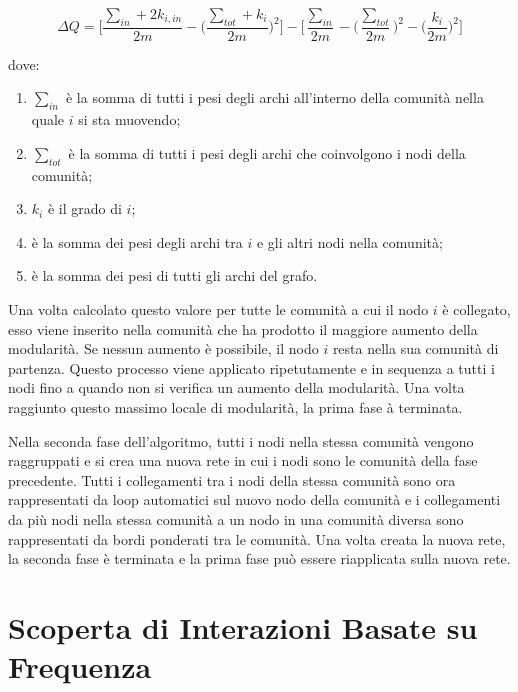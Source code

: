\begin{equation}
\Delta Q = \Biggl[ \frac{\sum_{in} + 2k_{i,in}}{2m} - \Biggl(\frac{\sum_{tot} + k_i}{2m} \Biggr)^2 \Biggr] - \Biggl[ \frac{\sum_{in}}{2m} - \Biggl(\frac{\sum_{tot}}{2m} \Biggr)^2 - \Biggl(\frac{k_i}{2m} \Biggr)^2 \Biggr]
\end{equation}

dove:

\begin{enumerate}[label=(\roman*)]
  
\item \( \sum_{in} \) {\`e} la somma di tutti i pesi degli archi all'interno della comunità nella quale \( i \) si sta muovendo;
\item \( \sum_{tot} \) {\`e}  la somma di tutti i pesi degli archi che coinvolgono i nodi della comunit{\`a};
\item \( k_i \) {\`e} il grado di \( i \);
\item {\`e} la somma dei pesi degli archi tra \( i \) e gli altri nodi nella comunit{\`a};
\item {\`e} la somma dei pesi di tutti gli archi del grafo.

\end{enumerate}

Una volta calcolato questo valore per tutte le comunit{\`a} a cui il nodo \( i \) {\`e} collegato, esso viene inserito nella comunit{\`a} che ha prodotto il maggiore aumento della modularit{\`a}. Se nessun aumento {\`e} possibile, il nodo \( i \) resta nella sua comunit{\`a} di partenza. Questo processo viene applicato ripetutamente e in sequenza a tutti i nodi fino a quando non si verifica un aumento della modularit{\`a}. Una volta raggiunto questo massimo locale di modularit{\`a}, la prima fase {\`a} terminata.

Nella seconda fase dell'algoritmo, tutti i nodi nella stessa comunit{\`a} vengono raggruppati e si crea una nuova rete in cui i nodi sono le comunit{\`a} della fase precedente. Tutti i collegamenti tra i nodi della stessa comunit{\`a} sono ora rappresentati da loop automatici sul nuovo nodo della comunità e i collegamenti da pi{\`u} nodi nella stessa comunità a un nodo in una comunit{\`a} diversa sono rappresentati da bordi ponderati tra le comunit{\`a}. Una volta creata la nuova rete, la seconda fase {\`e} terminata e la prima fase pu{\`o} essere riapplicata sulla nuova rete.

\section{Scoperta di Interazioni Basate su Frequenza}

